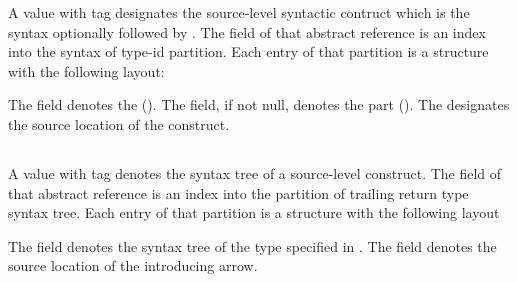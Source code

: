 A  value with tag  designates the source-level
syntactic contruct  which is the syntax
 optionally followed by . 
The  field of that abstract reference is an index into the syntax of type-id partition.
Each entry of that partition is a structure with the following layout:
%
\begin{figure}[H]
	\centering
	\label{fig:ifc:SyntaxSort:TypeId}
\end{figure}
%
The  field denotes the  ().
The  field, if not null, denotes the  part ().
The  designates the source location of the  construct.



\subsection{}
\label{sec:ifc:SyntaxSort:TrailingReturnType}

A  value with tag  denotes the syntax tree of a source-level  construct.
The  field of that abstract reference is an index into the partition of trailing return type syntax tree.
Each entry of that partition is a structure with the following layout
%
\begin{figure}[H]
	\centering
	\label{fig:ifc:SyntaxSort:TrailingReturnType}
\end{figure}
%
The  field denotes the syntax tree of the type specified in .
The  field denotes the source location of the introducing arrow.





